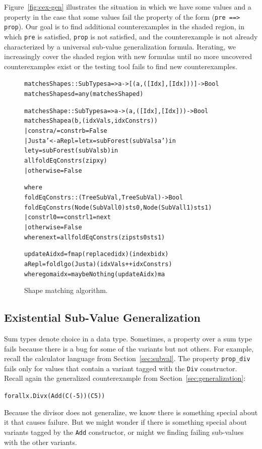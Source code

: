 \documentclass[10pt]{sigplanconf}
\newenvironment{code}{\begin{alltt}\small}{\end{alltt}}
\newcommand{\ttp}[1]{\texttt{#1}}
\begin{document}
Figure~\ref{fig:cex-gen} illustrates the situation in which we have some values
and a property in the case that some values fail the property of the form
(\ttp{pre ==> prop}).  Our goal is to find additional counterexamples in the
shaded region, in which \ttp{pre} is satisfied, \ttp{prop} is not satisfied, and
the counterexample is not already characterized by a universal sub-value
generalization formula.  Iterating, we increasingly cover the shaded region
with new formulas until no more uncovered counterexamples exist or the testing
tool fails to find new counterexamples.

\begin{figure}
  \begin{code}
matchesShapes :: SubTypes a => a -> [(a,([Idx],[Idx]))] -> Bool
matchesShapes d = any (matchesShape d)

matchesShape :: SubTypes a => a -> (a, ([Idx],[Idx])) -> Bool
matchesShape a (b, (idxVals, idxConstrs))
  | constr a /= constr b = False
  | Just a' <- aRepl         = let x = subForest (subVals a') in
                               let y = subForest (subVals b) in
                               all foldEqConstrs (zip x y)
  | otherwise                = False

  where
  foldEqConstrs :: (Tree SubVal, Tree SubVal) -> Bool
  foldEqConstrs (Node (SubVal l0) sts0, Node (SubVal l1) sts1)
    | constr l0 == constr l1 = next
    | otherwise              = False
    where next = all foldEqConstrs (zip sts0 sts1)

  updateA idx d = fmap (replace d idx) (index b idx)
  aRepl = foldl go (Just a) (idxVals ++ idxConstrs)
    where go ma idx = maybe Nothing (updateA idx) ma
  \end{code}
  \caption{Shape matching algorithm.}
  \label{fig:matches}
\end{figure}




\subsection{Existential Sub-Value Generalization}

Sum types denote choice in a data type.  Sometimes, a property over a sum type
fails because there is a bug for some of the variants but not others.  For
example, recall the calculator language from Section~\ref{sec:subval}.  The
property \ttp{prop\_div} fails only for values that contain a variant tagged
with the \ttp{Div} constructor.  Recall again the generalized counterexample
from Section~\ref{sec:generalization}:
%
\begin{code}
forall x . Div x (Add (C (-5)) (C 5))
\end{code}
%
\noindent
Because the divisor does not generalize, we know there is something special
about it that causes failure.  But we might wonder if there is something special
about variants tagged by the \ttp{Add} constructor, or might we finding failing
sub-values with the other variants.
\end{document}
